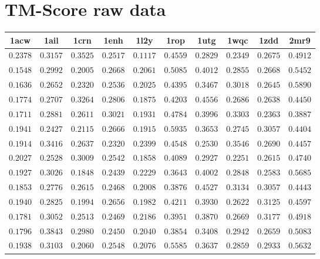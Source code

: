 \chapter{TM-Score raw data}\label{appendix:tmscore-data}

\centering
\begin{longtable}{c|c|c|c|c|c|c|c|c|c}
1acw & 1ail & 1crn & 1enh & 1l2y & 1rop & 1utg & 1wqc & 1zdd & 2mr9 \\ \hline \hline
$0.2378$ & $0.3157$ & $0.3525$ & $0.2517$ & $0.1117$ & $0.4559$ & $0.2829$ & $0.2349$ & $0.2675$ & $0.4912$ \\ \hline
$0.1548$ & $0.2992$ & $0.2005$ & $0.2668$ & $0.2061$ & $0.5085$ & $0.4012$ & $0.2855$ & $0.2668$ & $0.5452$ \\ \hline
$0.1636$ & $0.2652$ & $0.2320$ & $0.2536$ & $0.2025$ & $0.4395$ & $0.3467$ & $0.3018$ & $0.2645$ & $0.5890$ \\ \hline
$0.1774$ & $0.2707$ & $0.3264$ & $0.2806$ & $0.1875$ & $0.4203$ & $0.4556$ & $0.2686$ & $0.2638$ & $0.4450$ \\ \hline
$0.1711$ & $0.2881$ & $0.2611$ & $0.3021$ & $0.1931$ & $0.4784$ & $0.3996$ & $0.3303$ & $0.2363$ & $0.3887$ \\ \hline
$0.1941$ & $0.2427$ & $0.2115$ & $0.2666$ & $0.1915$ & $0.5935$ & $0.3653$ & $0.2745$ & $0.3057$ & $0.4404$ \\ \hline
$0.1914$ & $0.3416$ & $0.2637$ & $0.2320$ & $0.2399$ & $0.4548$ & $0.2530$ & $0.3546$ & $0.2690$ & $0.4457$ \\ \hline
$0.2027$ & $0.2528$ & $0.3009$ & $0.2542$ & $0.1858$ & $0.4089$ & $0.2927$ & $0.2251$ & $0.2615$ & $0.4740$ \\ \hline
$0.1927$ & $0.3026$ & $0.1848$ & $0.2439$ & $0.2229$ & $0.3643$ & $0.4002$ & $0.2848$ & $0.2583$ & $0.5685$ \\ \hline
$0.1853$ & $0.2776$ & $0.2615$ & $0.2468$ & $0.2008$ & $0.3876$ & $0.4527$ & $0.3134$ & $0.3057$ & $0.4443$ \\ \hline
$0.1940$ & $0.2825$ & $0.1994$ & $0.2656$ & $0.1982$ & $0.4211$ & $0.3930$ & $0.2622$ & $0.3125$ & $0.4597$ \\ \hline
$0.1781$ & $0.3052$ & $0.2513$ & $0.2469$ & $0.2186$ & $0.3951$ & $0.3870$ & $0.2669$ & $0.3177$ & $0.4918$ \\ \hline
$0.1796$ & $0.3843$ & $0.2980$ & $0.2450$ & $0.2040$ & $0.3854$ & $0.3408$ & $0.2942$ & $0.2659$ & $0.5083$ \\ \hline
$0.1938$ & $0.3103$ & $0.2060$ & $0.2548$ & $0.2076$ & $0.5585$ & $0.3637$ & $0.2859$ & $0.2933$ & $0.5632$ \\ \hline

\end{longtable}
